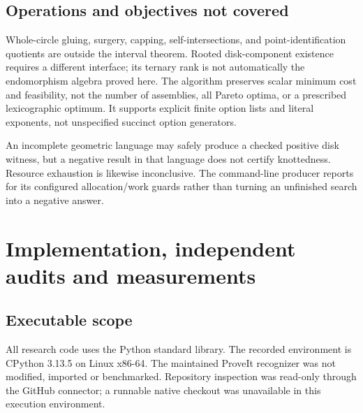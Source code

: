 \documentclass[11pt,a4paper]{article}
\theoremstyle{definition}
\newcommand{\code}[1]{\texttt{\detokenize{#1}}}
\begin{document}
\subsection{Operations and objectives not covered}
Whole-circle gluing, surgery, capping, self-intersections, and point-identification quotients are outside the interval theorem. Rooted disk-component existence requires a different interface; its ternary rank is not automatically the endomorphism algebra proved here. The algorithm preserves scalar minimum cost and feasibility, not the number of assemblies, all Pareto optima, or a prescribed lexicographic optimum. It supports explicit finite option lists and literal exponents, not unspecified succinct option generators.

An incomplete geometric language may safely produce a checked positive disk witness, but a negative result in that language does not certify knottedness. Resource exhaustion is likewise inconclusive. The command-line producer reports \code{UNKNOWN_RESOURCE_LIMIT} for its configured allocation/work guards rather than turning an unfinished search into a negative answer.

\section{Implementation, independent audits and measurements}\label{sec:measurements}

\subsection{Executable scope}
All research code uses the Python standard library. The recorded environment is CPython 3.13.5 on Linux x86-64. The maintained ProveIt recognizer was not modified, imported or benchmarked. Repository inspection was read-only through the GitHub connector; a runnable native checkout was unavailable in this execution environment.
\end{document}
